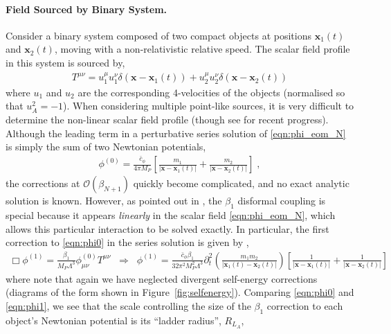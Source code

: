 \documentclass[11pt]{article}
\newcommand{\con}{  \bar{c}_{\phi} }
\begin{document}
\paragraph{Field Sourced by Binary System.}
Consider a binary system composed of two compact objects at positions $\mathbf{x}_1 (t)$ and $\mathbf{x}_2 (t)$, moving with a non-relativistic relative speed. The scalar field profile in this system is sourced by,  
\begin{align}
 T^{\mu\nu} =  u_1^\mu u_1^\nu  \delta \left( \mathbf{x} - \mathbf{x}_1 (t) \right) + u_2^\mu u_2^\nu  \delta \left( \mathbf{x} - \mathbf{x}_2 (t) \right)
\end{align}
where $u_1$ and $u_2$ are the corresponding 4-velocities of the objects (normalised so that $u_A^2 = -1$). 
When considering multiple point-like sources, it is very difficult to determine the non-linear scalar field profile (though see \cite{Dar:2018dra, Kuntz:2019plo, Brax:2020ujo, Renevey:2021tcz} for recent progress). 
Although the leading term in a perturbative series solution of \eqref{eqn:phi_eom_N} is simply the sum of two Newtonian potentials,
\begin{align}
\phi^{(0)} = \frac{\con}{4 \pi M_P} \left[  \frac{ m_1}{  | \mathbf{x} - \mathbf{x}_1 (t) |} + \frac{ m_2}{ | \mathbf{x} - \mathbf{x}_2 (t) |} \right]  \; ,
\label{eqn:phi0}
\end{align}
the corrections at $\mathcal{O} ( \beta_{N+1} )$ quickly become complicated, and no exact analytic solution is known. 
However, as pointed out in \cite{Davis:2019ltc}, the $\beta_1$ disformal coupling is special because it appears \emph{linearly} in the scalar field \eqref{eqn:phi_eom_N}, which allows this particular interaction to be solved exactly.
In particular, the first correction to \eqref{eqn:phi0} in the series solution is given by \cite{Brax:2018bow, Brax:2019tcy},
\begin{align}
\Box \phi^{(1)} = \frac{\beta_1}{M_P \Lambda^3} \phi^{(0)}_{\mu\nu} T^{\mu\nu} \;\; \Rightarrow \;\; \phi^{(1)} =  \frac{ \con \beta_1 }{ 32 \pi^2 M_P^2 \Lambda^3}   \partial_t^2 \left( \frac{ m_1 m_2 }{| \mathbf{x}_1 (t) - \mathbf{x}_2 (t) |}  \right) \left[
\frac{1}{| \mathbf{x} - \mathbf{x}_1 (t) |} + \frac{1}{ | \mathbf{x} - \mathbf{x}_2 (t) |}
 \right]   
 \label{eqn:phi1}
\end{align}
where note that again we have neglected divergent self-energy corrections (diagrams of the form shown in Figure~\ref{fig:selfenergy}).  
Comparing \eqref{eqn:phi0} and \eqref{eqn:phi1}, we see that the scale controlling the size of the $\beta_1$ correction to each object's Newtonian potential is its ``ladder radius'', $R_{L_A}$, 
\end{document}
